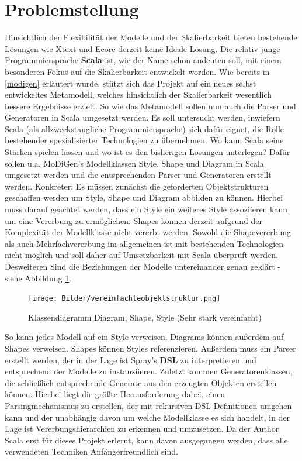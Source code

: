 \section{Problemstellung}
Hinsichtlich der Flexibilität der Modelle und der Skalierbarkeit bieten bestehende Lösungen wie Xtext und Ecore derzeit keine Ideale Lösung. Die relativ junge Programmiersprache \textbf{Scala} ist, wie der Name schon andeuten soll, mit einem besonderen Fokus auf die Skalierbarkeit entwickelt worden. Wie bereits in \ref{modigen} erläutert wurde, stützt sich das Projekt auf ein neues selbst entwickeltes Metamodell, welches hinsichtlich der Skalierbarkeit wesentlich bessere Ergebnisse erzielt. So wie das Metamodell sollen nun auch die Parser und Generatoren in Scala umgesetzt werden. Es soll untersucht werden, inwiefern Scala (als allzweckstaugliche Programmiersprache) sich dafür eignet, die Rolle bestehender spezialisierter Technologien zu übernehmen. Wo kann Scala seine Stärken spielen lassen und wo ist es den bisherigen Lösungen unterlegen? Dafür sollen u.a. MoDiGen's Modellklassen Style, Shape und Diagram in Scala umgesetzt werden und die entsprechenden Parser und Generatoren erstellt werden. Konkreter: Es müssen zunächst die geforderten Objektstrukturen geschaffen werden um Style, Shape und Diagram abbilden zu können. Hierbei muss darauf geachtet werden, dass ein Style ein weiteres Style assoziieren kann um eine Vererbung zu ermöglichen. Shapes können derzeit aufgrund der Komplexität der Modellklasse nicht vererbt werden. Sowohl die Shapevererbung als auch Mehrfachvererbung im allgemeinen ist mit bestehenden Technologien nicht möglich und soll daher auf Umsetzbarkeit mit Scala überprüft werden. Desweiteren Sind die Beziehungen der Modelle untereinander genau geklärt - siehe Abbildung \ref{diagramshapestyle}.
\begin{figure}[h]
\begin{center}
\texttt{[image: Bilder/vereinfachteobjektstruktur.png]}
\caption{Klassendiagramm Diagram, Shape, Style (Sehr stark vereinfacht)}
\label{diagramshapestyle}
\end{center}
\end{figure}So kann jedes Modell auf ein Style verweisen. Diagrams können außerdem auf Shapes verweisen. Shapes können Styles referenzieren. Außerdem muss ein Parser erstellt werden, der in der Lage ist Spray's \textbf{DSL} zu interpretieren und entsprechend der Modelle zu instanziieren. Zuletzt kommen Generatorenklassen, die schließlich entsprechende Generate aus den erzeugten Objekten erstellen können. Hierbei liegt die größte Herausforderung dabei, einen Parsingmechanismus zu erstellen, der mit rekursiven DSL-Definitionen umgehen kann und der unabhängig davon um welche Modellklasse es sich handelt, in der Lage ist Vererbungshierarchien zu erkennen und umzusetzen. Da der Author Scala erst für dieses Projekt erlernt, kann davon ausgegangen werden, dass alle verwendeten Techniken Anfängerfreundlich sind.
